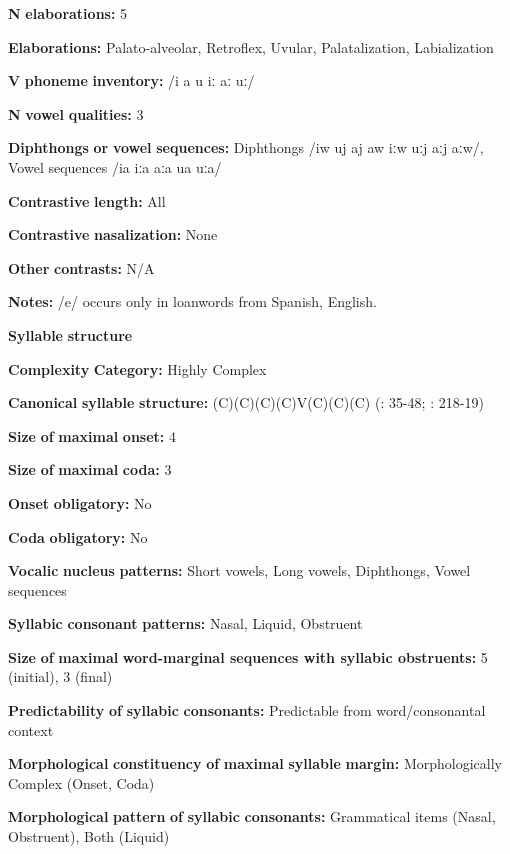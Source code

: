 \begin{styleBody}
\textbf{N} \textbf{elaborations:} 5

\textbf{Elaborations:} Palato-alveolar, Retroflex, Uvular, Palatalization, Labialization

\textbf{V} \textbf{phoneme} \textbf{inventory:} /i a u iː aː uː/

\textbf{N} \textbf{vowel} \textbf{qualities:} 3

\textbf{Diphthongs} \textbf{or} \textbf{vowel} \textbf{sequences:} Diphthongs /iw uj aj aw iːw uːj aːj aːw/, Vowel sequences /ia iːa aːa ua uːa/

\textbf{Contrastive} \textbf{length:} All

\textbf{Contrastive} \textbf{nasalization:} None

\textbf{Other} \textbf{contrasts:} N/A

\textbf{Notes:} /e/ occurs only in loanwords from Spanish, English.

\textbf{Syllable} \textbf{structure}

\textbf{Complexity} \textbf{Category:} Highly Complex

\textbf{Canonical} \textbf{syllable} \textbf{structure:} (C)(C)(C)(C)V(C)(C)(C) (\citealt{Crawford1966}: 35-48; \citealt{Bendixen1980}: 218-19)

\textbf{Size} \textbf{of} \textbf{maximal} \textbf{onset:} 4

\textbf{Size} \textbf{of} \textbf{maximal} \textbf{coda:} 3

\textbf{Onset} \textbf{obligatory:} No

\textbf{Coda} \textbf{obligatory:} No

\textbf{Vocalic} \textbf{nucleus} \textbf{patterns:} Short vowels, Long vowels, Diphthongs, Vowel sequences

\textbf{Syllabic} \textbf{consonant} \textbf{patterns:} Nasal, Liquid, Obstruent

\textbf{Size} \textbf{of} \textbf{maximal} \textbf{word{}-marginal sequences with syllabic obstruents:} 5 (initial), 3 (final)

\textbf{Predictability} \textbf{of} \textbf{syllabic} \textbf{consonants:} Predictable from word/consonantal context

\textbf{Morphological} \textbf{constituency} \textbf{of} \textbf{maximal} \textbf{syllable} \textbf{margin:} Morphologically Complex (Onset, Coda)

\textbf{Morphological} \textbf{pattern} \textbf{of} \textbf{syllabic} \textbf{consonants:} Grammatical items (Nasal, Obstruent), Both (Liquid)


\end{styleBody}
